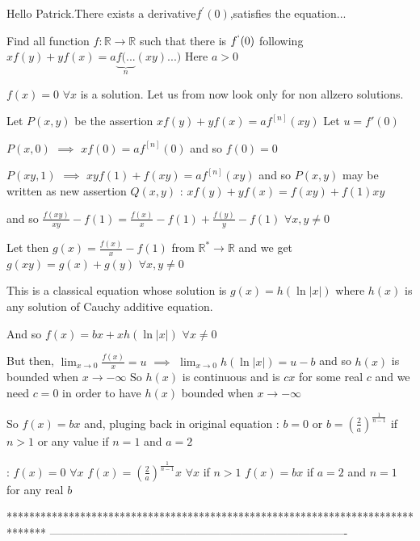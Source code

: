 \begin{solution}
	Hello Patrick.There exists a derivative$f^{'}(0)$,satisfies the equation...
\end{solution}



\begin{solution}
	\begin{tcolorbox}Find all function $ f: \mathbb{R}\to\mathbb{R}$ such that there is $ f^{`}(0)$ following   $ xf(y)+yf(x)=a\underbrace {f( ...}_{n}(xy)...)$  Here  $ a>0$   \end{tcolorbox}
$f(x)=0$ $\forall x$ is a solution. Let us from now look only for non allzero solutions.

Let $P(x,y)$ be the assertion $xf(y)+yf(x)=af^{[n]}(xy)$
Let $u=f'(0)$

$P(x,0)$ $\implies$ $xf(0)=af^{[n]}(0)$ and so $f(0)=0$

$P(xy,1)$ $\implies$ $xyf(1)+f(xy)=af^{[n]}(xy)$ and so $P(x,y)$ may be written as new assertion 
$Q(x,y)$ : $xf(y)+yf(x)=f(xy)+f(1)xy$

and so $\frac{f(xy)}{xy}-f(1)=\frac{f(x)}x-f(1)+\frac{f(y)}y-f(1)$ $\forall x,y\ne 0$

Let then $g(x)=\frac{f(x)}x-f(1)$ from $\mathbb R^*\to\mathbb R$ and we get $g(xy)=g(x)+g(y)$ $\forall x,y\ne 0$

This is a classical equation whose solution is $g(x)=h(\ln |x|)$ where $h(x)$ is any solution of Cauchy additive equation.

And so $f(x)=bx+xh(\ln |x|)$ $\forall x\ne 0$

But then, $\lim_{x\to 0}\frac{f(x)}x=u$ $\implies$  $\lim_{x\to 0}h(\ln|x|)=u-b$ and so $h(x)$ is bounded when $x\to-\infty$
So $h(x)$ is continuous and is $cx$ for some real $c$ and we need $c=0$ in order to have $h(x)$ bounded when $x\to-\infty$

So $f(x)=bx$ and, pluging back in original equation : $b=0$ or $b=\left(\frac 2a\right)^{\frac 1{n-1}}$ if $n>1$ or any value if $n=1$ and $a=2$


 :
$f(x)=0$ $\forall x$
$f(x)=\left(\frac 2a\right)^{\frac 1{n-1}}x$ $\forall x$  if $n>1$
$f(x)=bx$ if $a=2$ and $n=1$ for any real $b$
\end{solution}
*******************************************************************************
-------------------------------------------------------------------------------

